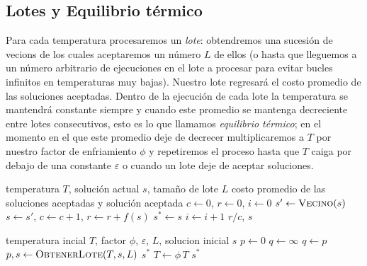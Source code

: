 \documentclass[11pt,letterpaper]{article}
\begin{document}
\subsection{Lotes y Equilibrio térmico}
Para cada temperatura procesaremos un \emph{lote}: obtendremos una sucesión de vecions de los cuales aceptaremos un número $L$ de ellos (o hasta que lleguemos a un número arbitrario de ejecuciones en el lote a procesar para evitar bucles infinitos en temperaturas muy bajas). Nuestro lote regresará el costo promedio de las soluciones aceptadas. Dentro de la ejecución de cada lote la temperatura se mantendrá constante siempre y cuando este promedio se mantenga decreciente entre lotes consecutivos, esto es lo que llamamos \emph{equilibrio térmico}; en el momento en el que este promedio deje de decrecer multiplicaremos a $T$ por nuestro factor de enfriamiento $\phi$ y repetiremos el proceso hasta que $T$ caiga por debajo de una constante $\varepsilon$ o cuando un lote deje de aceptar soluciones.

\begin{algorithm}[H]
\caption{ObtenerLote}
\label{alg:batch}
\begin{algorithmic}[1]
\Require temperatura $T$, solución actual $s$, tamaño de lote $L$
\Ensure costo promedio de las soluciones aceptadas y solución aceptada
\State $c \gets 0$, $r \gets 0$, $i \gets 0$
  \State $s' \gets \textsc{Vecino}(s)$
    \State $s \gets s'$, \; $c \gets c + 1$, \; $r \gets r + f(s)$
     \State $s^* \gets s$  \EndIf
  \EndIf
  \State $i \gets i + 1$
\EndWhile
\State \Return $r / c$, $s$
\end{algorithmic}
\end{algorithm}

\begin{algorithm}[H]
\caption{AceptaUmbrales}
\label{alg:threshold}
\begin{algorithmic}[1]
\Require temperatura incial $T$, factor $\phi$, $\varepsilon$, $L$,
         solucion inicial $s$
\State $p \gets 0$
  \State $q \gets \infty$
    \State $q \gets p$
    \State $p, s \gets \textsc{ObtenerLote}(T, s, L)$
     \State \Return $s^*$ \EndIf
  \EndWhile
  \State $T \gets \phi \, T$
\EndWhile
\State \Return $s^*$
\end{algorithmic}
\end{algorithm}
\end{document}
